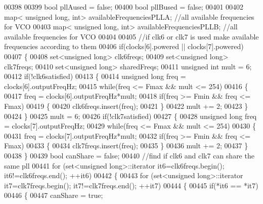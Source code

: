 \begin{DoxyCode}
{00398 
00399     \textcolor{keywordtype}{bool} pllAused = \textcolor{keyword}{false};
00400     \textcolor{keywordtype}{bool} pllBused = \textcolor{keyword}{false};
00401 
00402     map< unsigned long, int> availableFrequenciesPLLA; \textcolor{comment}{//all available frequencies for VCO}
00403     map< unsigned long, int> availableFrequenciesPLLB; \textcolor{comment}{//all available frequencies for VCO}
00404 
00405     \textcolor{comment}{//if clk6 or clk7 is used make available frequencies according to them}
00406     \textcolor{keywordflow}{if}(clocks[6].powered || clocks[7].powered)
00407     \{
00408         set<unsigned long> clk6freqs;
00409         set<unsigned long> clk7freqs;
00410         set<unsigned long> sharedFreqs;
00411         \textcolor{keywordtype}{unsigned} \textcolor{keywordtype}{int} mult = 6;
00412         \textcolor{keywordflow}{if}(!clk6satisfied)
00413         \{
00414             \textcolor{keywordtype}{unsigned} \textcolor{keywordtype}{long} freq = clocks[6].outputFreqHz;
00415             \textcolor{keywordflow}{while}(freq <= Fmax && mult <= 254)
00416             \{
00417                 freq = clocks[6].outputFreqHz*mult;
00418                 \textcolor{keywordflow}{if}(freq >= Fmin && freq <= Fmax)
00419                 \{
00420                     clk6freqs.insert(freq);
00421                 \}
00422                 mult += 2;
00423             \}
00424         \}
00425         mult = 6;
00426         \textcolor{keywordflow}{if}(!clk7satisfied)
00427         \{
00428             \textcolor{keywordtype}{unsigned} \textcolor{keywordtype}{long} freq = clocks[7].outputFreqHz;
00429             \textcolor{keywordflow}{while}(freq <= Fmax && mult <= 254)
00430             \{
00431                 freq = clocks[7].outputFreqHz*mult;
00432                 \textcolor{keywordflow}{if}(freq >= Fmin && freq <= Fmax)
00433                 \{
00434                     clk7freqs.insert(freq);
00435                 \}
00436                 mult += 2;
00437             \}
00438         \}
00439         \textcolor{keywordtype}{bool} canShare = \textcolor{keyword}{false};
00440         \textcolor{comment}{//find if clk6 and clk7 can share the same pll}
00441         \textcolor{keywordflow}{for} (set<unsigned long>::iterator it6=clk6freqs.begin(); it6!=clk6freqs.end(); ++it6)
00442         \{
00443             \textcolor{keywordflow}{for} (set<unsigned long>::iterator it7=clk7freqs.begin(); it7!=clk7freqs.end(); ++it7)
00444             \{
00445                 \textcolor{keywordflow}{if}(*it6 == *it7)
00446                 \{
00447                     canShare = \textcolor{keyword}{true};
}
\end{DoxyCode}
